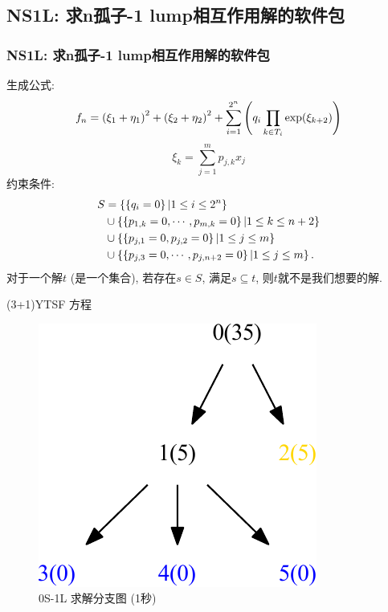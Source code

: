 \subsection{NS1L: 求n孤子-1 lump相互作用解的软件包}
\begin{frame}
\frametitle{NS1L: 求n孤子-1 lump相互作用解的软件包}
生成公式:
\[
    f_n=\left(\xi_1+\eta_1\right)^2+\left(\xi_2+\eta_2\right)^2+\sum_{i=1}^{2^n}\left(q_i\prod_{k \in T_i}{\exp(\xi_{k+2})}\right)
\]
\[
    \xi_k=\sum_{j=1}^m{p_{j,k}x_j}
\]
约束条件:
\[
\begin{split}
    S&=\left\{\left\{q_i=0\right\}|1\le i \le 2^n\right\} \\ 
        &\cup \left\{\left\{p_{1,k}=0,\cdots,p_{m,k}=0\right\}|1\le k \le n+2\right\}  \\
        &\cup \left\{\left\{p_{j,1}=0,p_{j,2}=0\right\}|1\le j \le m\right\} \\ 
        &\cup \left\{\left\{p_{j,3}=0,\cdots,p_{j,n+2}=0\right\}|1\le j \le m\right\} . 
\end{split}
\]
对于一个解$t$ (是一个集合), 若存在$s\in S$, 满足$s\subseteq t$, 则$t$就不是我们想要的解.
\end{frame}

\begin{frame}
(3+1)YTSF 方程
\begin{figure}
\centering
\includegraphics[width=.5\textwidth]{../paper/fig/0S1L.pdf}
\caption{0S-1L 求解分支图 (1秒)}
\end{figure}
\end{frame}

